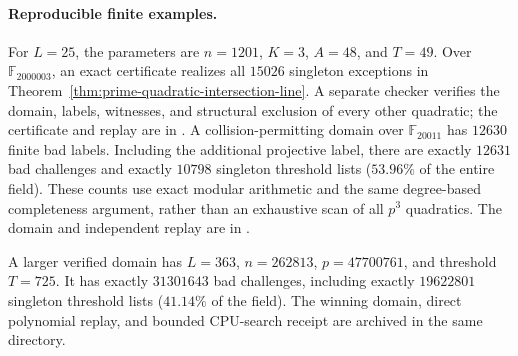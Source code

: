 \paragraph{Reproducible finite examples.}
For $L=25$, the parameters are $n=1201$, $K=3$, $A=48$, and $T=49$.
Over $\mathbb F_{2000003}$, an exact certificate realizes all $15026$
singleton exceptions in Theorem~\ref{thm:prime-quadratic-intersection-line}.
A separate checker verifies the domain, labels, witnesses, and structural
exclusion of every other quadratic; the certificate and replay are in
.
A collision-permitting domain over $\mathbb F_{20011}$ has $12630$ finite
bad labels. Including the additional projective label, there are exactly
$12631$ bad challenges and exactly $10798$ singleton threshold lists
($53.96\%$ of the entire field). These counts use exact modular arithmetic
and the same degree-based completeness argument, rather than an exhaustive
scan of all $p^3$ quadratics. The domain and independent replay are in
.

A larger verified domain has $L=363$, $n=262813$, $p=47700761$,
and threshold $T=725$. It has exactly $31301643$ bad challenges,
including exactly $19622801$ singleton threshold lists ($41.14\%$
of the field). The winning domain, direct polynomial replay, and bounded
CPU-search receipt are archived in the same directory.
